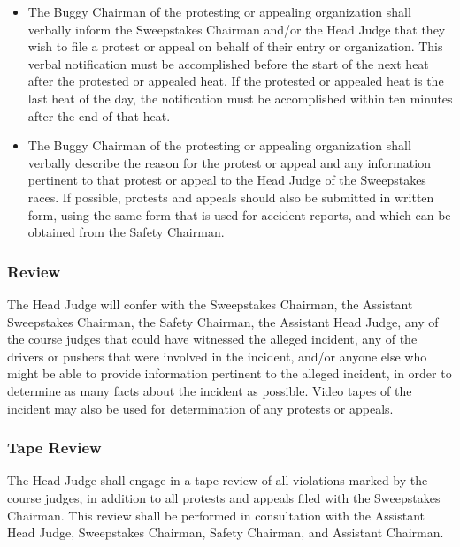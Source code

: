 	\begin{itemize}

		\item
		The Buggy Chairman of the protesting or appealing organization shall verbally inform the Sweepstakes Chairman and/or the Head Judge that they wish to file a protest or appeal on behalf of their entry or organization. This verbal notification must be accomplished before the start of the next heat after the protested or appealed heat. If the protested or appealed heat is the last heat of the day, the notification must be accomplished within ten minutes after the end of that heat.

		\item
		The Buggy Chairman of the protesting or appealing organization shall verbally describe the reason for the protest or appeal and any information pertinent to that protest or appeal to the Head Judge of the Sweepstakes races. If possible, protests and appeals should also be submitted in written form, using the same form that is used for accident reports, and which can be obtained from the Safety Chairman.

	\end{itemize}

\subsubsection{Review}

	The Head Judge will confer with the Sweepstakes Chairman, the Assistant Sweepstakes Chairman, the Safety Chairman, the Assistant Head Judge, any of the course judges that could have witnessed the alleged incident, any of the drivers or pushers that were involved in the incident, and/or anyone else who might be able to provide information pertinent to the alleged incident, in order to determine as many facts about the incident as possible. Video tapes of the incident may also be used for determination of any protests or appeals.

\subsubsection{Tape Review}

	The Head Judge shall engage in a tape review of all violations marked by the course judges, in addition to all protests and appeals filed with the Sweepstakes Chairman. This review shall be performed in	consultation with the Assistant Head Judge, Sweepstakes Chairman, Safety Chairman, and Assistant Chairman.

